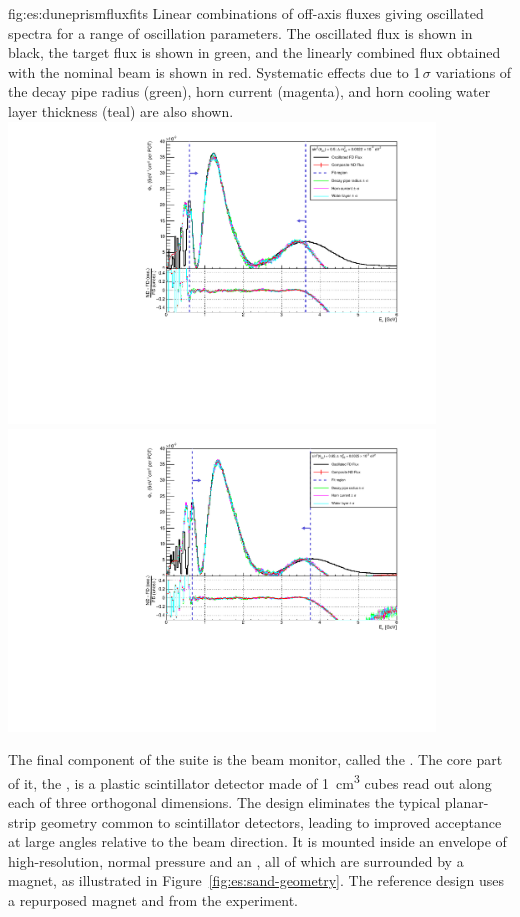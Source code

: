 \begin{dunefigure}{fig:es:duneprismfluxfits}
{Linear combinations of off-axis fluxes giving  oscillated spectra for a range of oscillation parameters. The   oscillated flux is shown in black, the target flux is shown in green, and the linearly combined flux obtained with the nominal beam  is shown in red. Systematic effects due to 1$\,\sigma$ variations of the decay pipe radius (green), horn current (magenta), and horn cooling water layer thickness (teal) are also shown.}
	\includegraphics[width=0.85\textwidth]{graphics/nuprism_coef_oscSpectrum_0_0022_0_5.pdf}
	\includegraphics[width=0.85\textwidth]{graphics/nuprism_coef_oscSpectrum_0_0025_0_65.pdf}
\end{dunefigure}

The final component of the   suite is the beam monitor, called the .  The core part of it, the , is a plastic scintillator detector made of \SI{1}{\cubic\centi\meter} cubes read out along each of three orthogonal dimensions.  The design eliminates the typical planar-strip geometry common to scintillator detectors, leading to improved acceptance at large angles relative to the beam direction. It is mounted  
inside an envelope of high-resolution, normal pressure  and an , all 
of which are surrounded by a magnet, as illustrated in Figure~\ref{fig:es:sand-geometry}.  The reference design uses a repurposed magnet and  from the  experiment.

